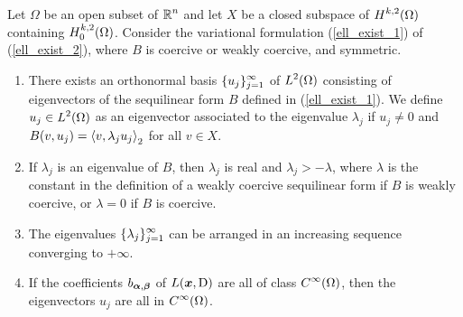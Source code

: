 \begin{theorem} \label{ell_exist_th3}
Let $\Omega$ be an open subset of $\displaystyle \mathbb{R}^n$ and let $X$ be a closed
subspace of $\displaystyle H^{k,2}(\Omega)$ containing
$\displaystyle H^{k,2}_0(\Omega)$.
Consider the variational formulation (\ref{ell_exist_1}) of
(\ref{ell_exist_2}), where $B$ is coercive or weakly coercive, and symmetric.
\begin{enumerate}
\item There exists an orthonormal basis $\displaystyle \{u_j\}_{j=1}^\infty$ of
$\displaystyle L^2(\Omega)$ consisting of eigenvectors of the sequilinear form
$B$ defined in (\ref{ell_exist_1}).  We define
$\displaystyle u_j \in L^2(\Omega)$ as
an eigenvector associated to the eigenvalue $\lambda_j$ if $u_j\neq 0$
and $B(v,u_j)= \left\langle{v} , {\lambda_j u_j}\right\rangle_2$ for all $v\in X$.
\item If $\lambda_j$ is an eigenvalue of $B$, then $\lambda_j$ is real
and $\lambda_j > -\lambda$, where $\lambda$ is the constant in the
definition of a weakly coercive sequilinear form if $B$ is weakly
coercive, or $\lambda =0$ if $B$ is coercive.
\item The eigenvalues $\displaystyle \{\lambda_j\}_{j=1}^\infty$ can
be arranged in an increasing sequence converging to $+\infty$.
\item If the coefficients $b_{{\bm{\alpha}},{\bm{\beta}}}$ of
$L({\bm{x}},\operatorname{D})$ are all of class $\displaystyle C^\infty(\Omega)$,
then the eigenvectors $u_j$ are all in $\displaystyle C^\infty(\Omega)$.
\end{enumerate}
\end{theorem}

